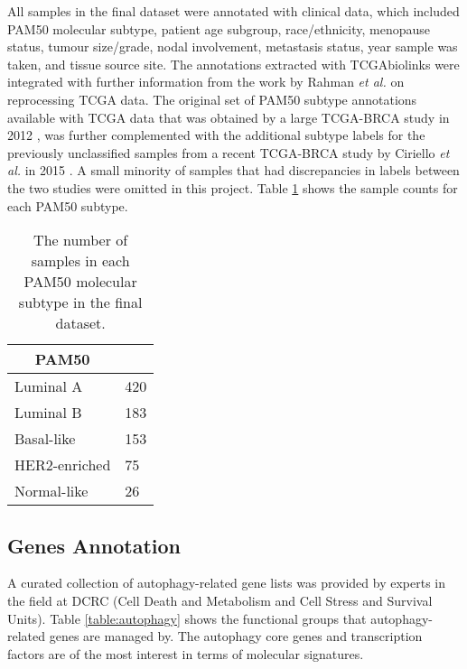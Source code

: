  

    All samples in the final dataset were annotated with clinical data, which included PAM50 molecular subtype, patient age subgroup, race/ethnicity, menopause status, tumour size/grade, nodal involvement, metastasis status, year sample was taken, and tissue source site. The annotations extracted with TCGAbiolinks were integrated with further information from the work by Rahman \textit{et al. }\cite{RahmanAlternativeResults} on reprocessing TCGA data. 
    The original set of PAM50 subtype annotations available with TCGA data that was obtained by a large TCGA-BRCA study in 2012 \cite{CancerGenomeAtlasNetwork2012ComprehensiveTumours}, was further complemented with the additional subtype labels for the previously unclassified samples from a recent TCGA-BRCA study by Ciriello \textit{et al.} in 2015 \cite{Ciriello2015ComprehensiveCancer}. A small minority of samples that had discrepancies in labels between the two studies were omitted in this project.  Table \ref{table:pam50counts} shows the sample counts for each PAM50 subtype. 
    
    
                \begin{table}[!htbp]
                \centering
                \caption[PAM50 samples count in the dataset]{The number of samples in each PAM50 molecular subtype in the final dataset.}
                \label{table:pam50counts}
                \begin{tabular}{ll}
                \multicolumn{1}{c}{\textbf{PAM50}} &  \\ \hline
                \multicolumn{1}{|l|}{Luminal A} & \multicolumn{1}{l|}{420} \\ \hline
                \multicolumn{1}{|l|}{Luminal B} & \multicolumn{1}{l|}{183} \\ \hline
                \multicolumn{1}{|l|}{Basal-like} & \multicolumn{1}{l|}{153} \\ \hline
                \multicolumn{1}{|l|}{HER2-enriched} & \multicolumn{1}{l|}{75} \\ \hline
                \multicolumn{1}{|l|}{Normal-like} & \multicolumn{1}{l|}{26} \\ \hline
                \end{tabular}
                \end{table}
                

    \subsection{Genes Annotation}   
    A curated collection of autophagy-related gene lists was provided by experts in the field at DCRC (Cell Death and Metabolism and Cell Stress and Survival Units). Table \ref{table:autophagy} shows the functional groups that autophagy-related genes are managed by. The autophagy core genes and transcription factors are of the most interest in terms of molecular signatures. 
    

